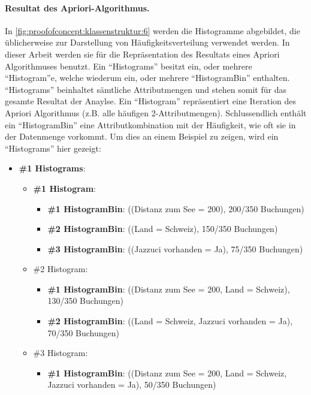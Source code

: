 \paragraph{Resultat des Apriori-Algorithmus.} In \cref{fig:proofofconcept:klassenstruktur:6} werden die Histogramme abgebildet, die üblicherweise zur Darstellung von Häufigkeitsverteilung verwendet werden. In dieser Arbeit werden sie für die Repräsentation des Resultats eines Apriori Algorithmuses benutzt. 
Ein "`Histograms"' besitzt ein, oder mehrere "`Histogram"'e, welche wiederum ein, oder mehrere "`HistogramBin"' enthalten. "`Histograms"' beinhaltet sämtliche Attributmengen und stehen somit für das gesamte Resultat der Anaylse. Ein "`Histogram"' repräsentiert eine Iteration des Apriori Algorithmus (z.B. alle häufigen 2-Attributmengen). Schlussendlich enthält ein "`HistogramBin"' eine Attributkombination mit der Häufigkeit, wie oft sie in der Datenmenge vorkommt. Um dies an einem Beispiel zu zeigen, wird ein "`Histograms"' hier gezeigt:
\begin{itemize}
\item \textbf{\#1 Histograms}:
	\begin{itemize}
		\item \textbf{\#1 Histogram}:
			\begin{itemize}
				\item \textbf{\#1 HistogramBin}: ((Distanz zum See = 200), 200/350 Buchungen)
				\item \textbf{\#2 HistogramBin}: ((Land = Schweiz), 150/350 Buchungen)
				\item \textbf{\#3 HistogramBin}: ((Jazzuci vorhanden = Ja), 75/350 Buchungen)
			\end{itemize}  
		\item \#2 Histogram:
			\begin{itemize}
				\item \textbf{\#1 HistogramBin}: ((Distanz zum See = 200, Land = Schweiz), 130/350 Buchungen)
				\item \textbf{\#2 HistogramBin}: ((Land = Schweiz, Jazzuci vorhanden = Ja), 70/350 Buchungen)
			\end{itemize}  
		\item \#3 Histogram:
			\begin{itemize}
				\item \textbf{\#1 HistogramBin}: ((Distanz zum See = 200, Land = Schweiz, Jazzuci vorhanden = Ja), 50/350 Buchungen)
			\end{itemize}  
	\end{itemize}  
\end{itemize}  


